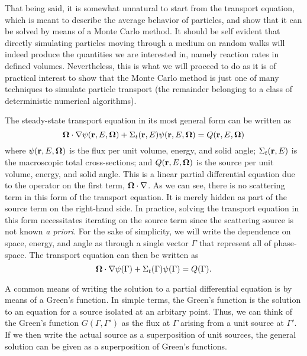 That being said, it is somewhat unnatural to start from the transport
equation, which is meant to describe the average behavior of
particles, and show that it can be solved by means of a Monte Carlo
method. It should be self evident that directly simulating particles
moving through a medium on random walks will indeed produce the
quantities we are interested in, namely reaction rates in defined
volumes. Nevertheless, this is what we will proceed to do as it is of
practical interest to show that the Monte Carlo method is just one of
many techniques to simulate particle transport (the remainder
belonging to a class of deterministic numerical algorithms).

The steady-state transport equation in its most general form can be
written as
\begin{equation}
  \mathbf{\Omega} \cdot \nabla \psi (\mathbf{r},E,\mathbf{\Omega}) + \Sigma_t(\mathbf{r},E) \psi
  (\mathbf{r},E,\mathbf{\Omega}) = Q(\mathbf{r},E,\mathbf{\Omega})
\end{equation}
where $\psi(\mathbf{r},E,\mathbf{\Omega})$ is the flux per unit volume, energy, and
solid angle; $\Sigma_t(\mathbf{r},E)$ is the macroscopic total
cross-sections; and $Q(\mathbf{r},E,\mathbf{\Omega})$ is the source per unit volume,
energy, and solid angle. This is a linear partial differential
equation due to the operator on the first term, $\mathbf{\Omega} \cdot
\nabla$. As we can see, there is no scattering term in this form of
the transport equation. It is merely hidden as part of the source term
on the right-hand side. In practice, solving the transport equation in
this form necessitates iterating on the source term since the
scattering source is not known {\em a priori}. For the sake of
simplicity, we will write the dependence on space, energy, and angle
as through a single vector $\Gamma$ that represent all of
phase-space. The transport equation can then be written as
\begin{equation}
  \mathbf{\Omega} \cdot \nabla \psi (\Gamma) + \Sigma_t(\Gamma) \psi (\Gamma)
  = Q(\Gamma).
  \label{eq:te-phase}
\end{equation}

A common means of writing the solution to a partial differential
equation is by means of a Green's function. In simple terms, the
Green's function is the solution to an equation for a source isolated
at an arbitary point. Thus, we can think of the Green's function
$G(\Gamma, \Gamma')$ as the flux at $\Gamma$ arising from a unit
source at $\Gamma'$. If we then write the actual source as a
superposition of unit sources, the general solution can be given as a
superposition of Green's functions.

